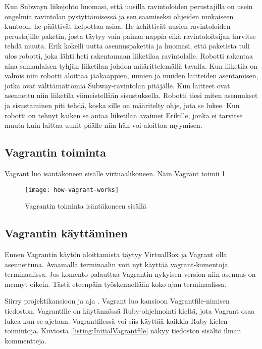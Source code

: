Kun Subwayn liikejohto huomasi, että uusilla ravintoloiden perustajilla on usein ongelmia ravintolan pystyttämisessä ja sen saamiseksi ohjeiden mukaiseen kuntoon,  he päättivät helpottaa asiaa. He kehittivät uusien ravintoloiden perustajille paketin, josta täytyy vain painaa nappia eikä ravintoloitsijan tarvitse tehdä muuta. Erik kokeili uutta asennuspakettia ja huomasi, että paketista tuli ulos robotti, joka lähti heti rakentamaan liiketilaa ravintolalle. Robotti rakentaa aina samanlaisen tyhjän liiketilan johdon määrittelemällä tavalla. Kun liiketila on valmis niin robotti aloittaa jääkaappien, uunien ja muiden laitteiden asentamisen, jotka ovat välttämättömiä Subway-ravintolan pitäjälle. Kun laitteet ovat asennettu niin liiketila viimeistellään sisustuksella. Robotti tiesi miten asennukset ja sisustaminen piti tehdä, koska sille on määritelty ohje, jota se lukee. Kun robotti on tehnyt kaiken se antaa liiketilan avaimet Erikille, jonka ei tarvitse muuta kuin laittaa uunit päälle niin hän voi aloittaa myymisen.

\subsection{Vagrantin toiminta}
Vagrant luo isäntäkoneen sisälle virtuaalikoneen. 
Näin Vagrant toimii \ref{fig:how-vagrant-works}

\begin{figure}[h]
  \texttt{[image: how-vagrant-works]}
  \caption{Vagrantin toiminta isäntäkoneen sisällä}
  \label{fig:how-vagrant-works}
\end{figure}

\subsection{Vagrantin käyttäminen}
Ennen Vagrantin käytön aloittamista täytyy VirtualBox ja Vagrant olla asennettuna. Avaamalla terminaalin voit nyt käyttää vagrant-komentoja terminaalissa. Jos komento  palauttaa Vagrantin nykyisen version niin asennus on mennyt oikein. Tästä eteenpäin työskennellään koko ajan terminaalissa.

Siirry projektikansioon ja aja . Vagrant luo kansioon Vagrantfile-nimisen tiedoston. Vagrantfile on käytännössä Ruby-ohjelmointi kieltä, jota Vagrant osaa lukea kun se ajetaan. Vagrantfilessä voi siis käyttää kaikkia Ruby-kielen toimintoja. Kuviosta \ref{listing:InitialVagrantfile} näkyy tiedoston sisältö ilman kommentteja.

